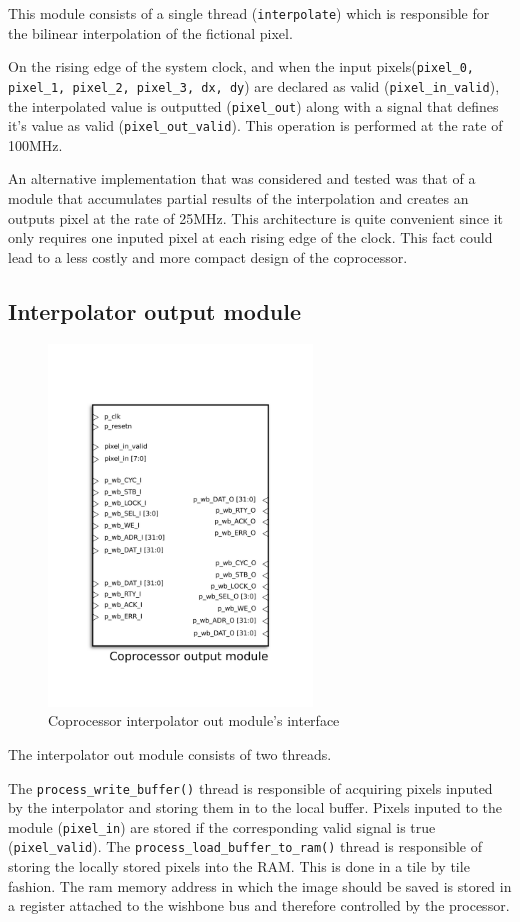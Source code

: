 This module consists of a single thread (\texttt{interpolate}) which is responsible for the bilinear interpolation of the fictional pixel. 

On the rising edge of the system clock, and when the input pixels(\texttt{pixel\_0, pixel\_1, pixel\_2, pixel\_3, dx, dy}) are declared as valid (\texttt{pixel\_in\_valid}), the interpolated value is outputted (\texttt{pixel\_out}) along with a signal that defines it's value as valid (\texttt{pixel\_out\_valid}). 
This operation is performed at the rate of 100MHz.  


An alternative implementation that was considered and tested was that of a module that accumulates partial results of the interpolation and creates an outputs pixel at the rate of 25MHz. This architecture is quite convenient since it only requires one inputed pixel at each rising edge of the clock. This fact could lead to a less costly and more compact design of the coprocessor.  

\subsection{Interpolator output module}

\begin{figure}[H]
\center
\includegraphics[width=7cm]{figs/INTERPOLATOR_OUT.pdf}
\caption{Coprocessor interpolator out module's interface}
\label{interpo_out_ports}
\end{figure}



The interpolator out module consists of two threads. 

The \texttt{process\_write\_buffer()} thread is responsible of acquiring pixels inputed by the interpolator and storing them in to the local buffer. Pixels inputed to the module (\texttt{pixel\_in}) are stored if the corresponding valid signal is true (\texttt{pixel\_valid}). The \texttt{process\_load\_buffer\_to\_ram()} thread is responsible of storing the locally stored pixels into the RAM. This is done in a tile by tile fashion. The ram memory address in which the image should be saved is stored in a register attached to the wishbone bus and therefore controlled by the processor. 

